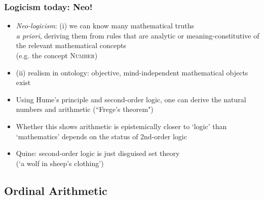 \begin{frame}
\frametitle{Logicism today: Neo!}

\begin{itemize}[<+->]

\item \emph{Neo-logicism}: (i) we can know many mathematical truths \\ \textit{a priori}, deriving them from rules that are analytic or meaning-constitutive of the relevant mathematical concepts \\ (e.g. the concept \textsc{Number}) 
\item[] (ii) realism in ontology: objective, mind-independent mathematical objects exist

\item Using Hume's principle and second-order logic, one can derive the natural numbers and arithmetic (``Frege's theorem")

\item Whether this shows arithmetic is epistemically closer to `logic' than `mathematics' depends on the status of 2nd-order logic

\item Quine: second-order logic is just disguised set theory \\ (`a wolf in sheep's clothing')


\end{itemize}
\end{frame}





\subsection{Ordinal Arithmetic}



